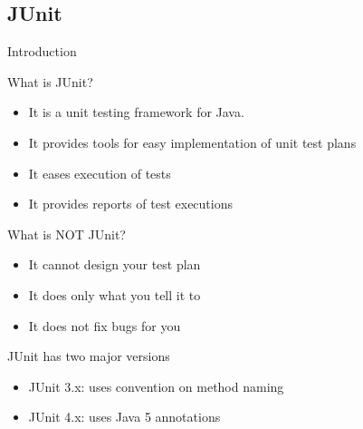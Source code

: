\subsection{JUnit}\subsectionpage
\begin{frame}{Introduction}
  \begin{block}{What is JUnit?}
    \begin{itemize}
    \item It is a unit testing framework for Java.
    \item It provides tools for easy implementation of unit test plans
    \item It eases execution of tests
    \item It provides reports of test executions
    \end{itemize}
  \end{block}

  \begin{block}{What is NOT JUnit?}
    \begin{itemize}
    \item It cannot design your test plan
    \item It does only what you tell it to
    \item It does not fix bugs for you
    \end{itemize}
  \end{block}

  \begin{block}{JUnit has two major versions}
    \begin{itemize}
    \item JUnit 3.x: uses convention on method naming
    \item JUnit 4.x: uses Java 5 annotations
    \end{itemize}
  \end{block}
\end{frame}
